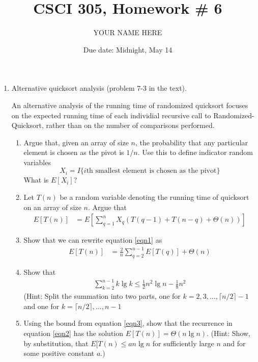 \documentclass{article}
\title{CSCI 305, Homework \# 6}
\author{YOUR NAME HERE}
\date{Due date:  Midnight, May 14}
\begin{document}
  
  \maketitle
  
  \begin{enumerate}
  \item Alternative quicksort analysis (problem 7-3 in the text).
  
    An alternative analysis of the running time of randomized quicksort
    focuses on the expected running time of each individial recursive
    call to {\sc Randomized-Quicksort}, rather than on the number of
    comparisons performed.
  
    \begin{enumerate}
      \item Argue that, given an array of size $n$, the probability that
        any particular element is chosen as the pivot is $1/n$.  Use
        this to define indicator random variables
        \[
        X_i = I\{\mbox{$i$th smallest element is chosen as the pivot}\}
        \]
        What is $E[X_i]$?
  
      \item
        Let $T(n)$ be a random variable denoting the running time of
        quicksort on an array of size $n$.  Argue that
        \begin{align}
        E[T(n)] &= E\left[
          \sum_{q=1}^n X_q(T(q-1) + T(n-q) + \Theta(n))
          \right]
        \label{eqn1}
        \end{align}
  
      \item
        Show that we can rewrite equation \ref{eqn1} as
        \begin{align}
          E[T(n)] &= \frac{2}{n}\sum_{q=2}^{n-1}E[T(q)] + \Theta(n)
            \label{eqn2}
        \end{align}
  
      \item
        Show that
        \begin{align}
          \sum_{k=2}^{n-1} k \lg k \leq \frac{1}{2}n^2\lg n -
          \frac{1}{8} n^2
          \label{eqn3}
        \end{align}
        (Hint: Split the summation into two parts, one for
        $k=2,3,...,\lceil n/2 \rceil - 1$
        and one for
        $k= \lceil n/2\rceil,...,n-1$
  
      \item
        Using the bound from equation \ref{eqn3}, show that the
        recurrence in equation \ref{eqn2} has the solution
        $E[T(n)] = \Theta(n\lg n)$.  (Hint: Show, by substitution, that
        $E[T(n)\leq an\lg n$ for sufficiently large $n$ and for some
          positive constant $a$.) 
  
    \end{enumerate}
  \end{enumerate}
  
  
\end{document}
